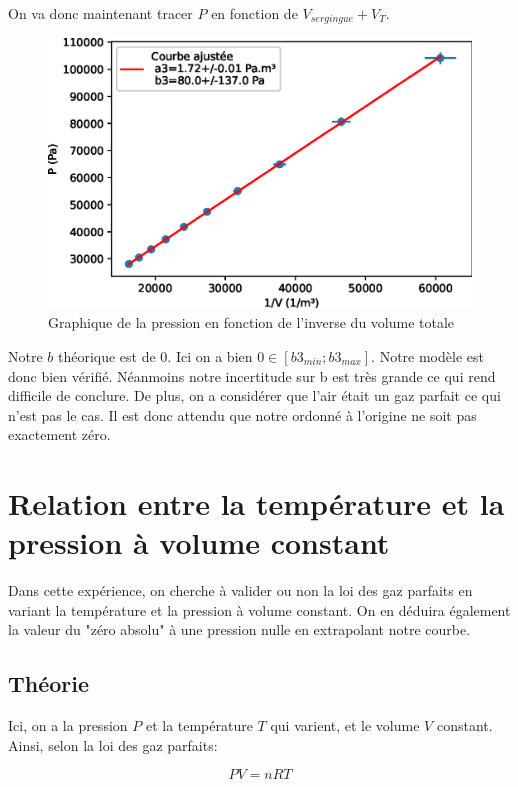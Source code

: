 \documentclass[12pt]{article}
\begin{document}
On va donc maintenant tracer $P$ en fonction de $V_{sergingue}+V_T$.
\begin{figure}[h!]
	\begin{center}
		\includegraphics[scale=1]{img/G3Exp1.eps}
		\caption{Graphique de la pression en fonction de l'inverse du volume totale}
	\end{center}
\end{figure}

Notre $b$ théorique est de 0. Ici on a bien $0\in [b3_{min};b3_{max}]$. Notre modèle est donc bien vérifié. Néanmoins notre incertitude sur b est très grande ce qui rend difficile de conclure. De plus, on a considérer que l'air était un gaz parfait ce qui n'est pas le cas. Il est donc attendu que notre ordonné à l'origine ne soit pas exactement zéro.  

\newpage
\section{Relation entre la température et la pression à volume constant}
Dans cette expérience, on cherche à valider ou non la loi des gaz parfaits en variant la température et la pression
à volume constant. On en déduira également la valeur du "zéro absolu" à une pression nulle en extrapolant notre courbe.

\subsection{Théorie}
Ici, on a la pression $P$ et la température $T$ qui varient, et le volume $V$ constant. Ainsi, selon la loi des gaz parfaits:

\begin{equation}
    PV = nRT
\end{equation}
\end{document}

